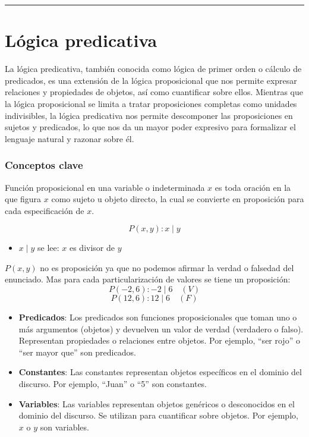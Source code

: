\rule{\textwidth}{.5pt}

\section{Lógica predicativa}
La lógica predicativa, también conocida como lógica de primer orden o cálculo de predicados, es una extensión de la lógica proposicional que nos permite expresar relaciones y propiedades de objetos, así como cuantificar sobre ellos. Mientras que la lógica proposicional se limita a tratar proposiciones completas como unidades indivisibles, la lógica predicativa nos permite descomponer las proposiciones en sujetos y predicados, lo que nos da un mayor poder expresivo para formalizar el lenguaje natural y razonar sobre él.


\subsubsection{Conceptos clave}
\vspace{1em}
\begin{fmd-definition} 
	Función proposicional en una variable o indeterminada $x$ es toda oración en la que figura $x$ como sujeto u objeto directo, la cual se convierte en proposición para cada especificación de $x$.
\end{fmd-definition}

\begin{fmd-example}
	\[ P(x, y): x \mid y \]
	
	\begin{itemize}
		\item $x \mid y$ se lee: $x$ es divisor de $y$
	\end{itemize}
	
	$P(x, y)$ no es proposición ya que no podemos afirmar la verdad o falsedad del enunciado. Mas para cada particularización de valores se tiene un proposición:
	\[ 
	P(-2, 6): -2 \mid 6 \quad (V)
	\]
	\[ P(12, 6): 12 \mid 6 \quad (F) \]
\end{fmd-example}

\begin{itemize}
	\item \textbf{Predicados}: Los predicados son funciones proposicionales que toman uno o más argumentos (objetos) y devuelven un valor de verdad (verdadero o falso). Representan propiedades o relaciones entre objetos. Por ejemplo, ``ser rojo'' o ``ser mayor que'' son predicados. 
	\item \textbf{Constantes}: Las constantes representan objetos específicos en el dominio del discurso. Por ejemplo, ``Juan'' o ``5'' son constantes.
	\item \textbf{Variables}: Las variables representan objetos genéricos o desconocidos en el dominio del discurso. Se utilizan para cuantificar sobre objetos. Por ejemplo, $x$ o $y$ son variables.
\end{itemize}

